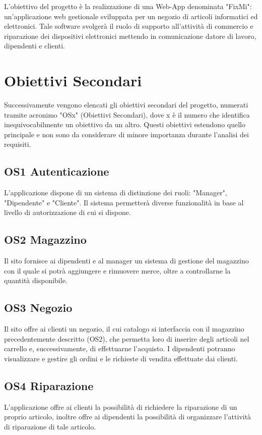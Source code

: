 \documentclass{report}
\begin{document}
L’obiettivo del progetto è la realizzazione di una Web-App denominata "FixMi": un'applicazione web gestionale sviluppata per un negozio di articoli informatici ed elettronici. Tale software svolgerà il ruolo di supporto all’attività di commercio e riparazione dei dispositivi elettronici mettendo in comunicazione datore di lavoro, dipendenti e clienti.


\section{Obiettivi Secondari}

Successivamente vengono elencati gli obiettivi secondari del progetto, numerati tramite acronimo "OSx" (Obiettivi Secondari), dove x è il numero che identifica inequivocabilmente un obiettivo da un altro. Questi obiettivi estendono quello principale e non sono da considerare di minore importanza durante l’analisi dei requisiti.


\subsection*{OS1 Autenticazione}
L’applicazione dispone di un sistema di distinzione dei ruoli: "Manager", "Dipendente" e "Cliente". Il sistema permetterà diverse funzionalità in base al livello di autorizzazione di cui si dispone.


\subsection*{OS2 Magazzino}
Il sito fornisce ai dipendenti e al manager un sistema di gestione del magazzino con il quale si potrà aggiungere e rimuovere merce, oltre a controllarne la quantità disponibile.


\subsection*{OS3 Negozio}
Il sito offre ai clienti un negozio, il cui catalogo si interfaccia con il magazzino precedentemente descritto (OS2), che permetta loro di inserire degli articoli nel carrello e, successivamente, di effettuarne l'acquisto. I dipendenti potranno visualizzare e gestire gli ordini e le richieste di vendita effettuate dai clienti.


\subsection*{OS4 Riparazione}
L’applicazione offre ai clienti la possibilità di richiedere la riparazione di un proprio articolo, inoltre offre ai dipendenti la possibilità di organizzare l’attività di riparazione di tale articolo.
\end{document}
